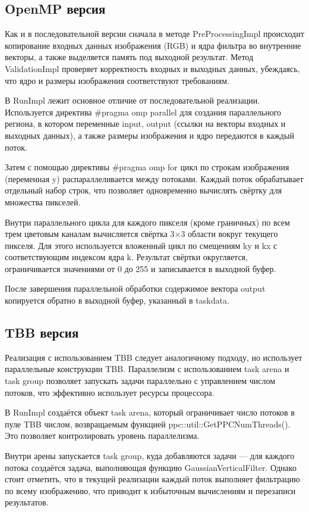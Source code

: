 \documentclass[12pt]{article}
\begin{document}
\subsection{OpenMP версия}

Как и в последовательной версии сначала в методе PreProcessingImpl происходит копирование входных данных изображения (RGB) и ядра фильтра во внутренние векторы, а также выделяется память под выходной результат. Метод ValidationImpl проверяет корректность входных и выходных данных, убеждаясь, что ядро и размеры изображения соответствуют требованиям.

В RunImpl лежит основное отличие от последовательной реализации. Используется директива \#pragma omp parallel для создания параллельного региона, в котором переменные input, output (ссылки на векторы входных и выходных данных), а также размеры изображения и ядро передаются в каждый поток.

Затем с помощью директивы \#pragma omp for цикл по строкам изображения (переменная y) распараллеливается между потоками. Каждый поток обрабатывает отдельный набор строк, что позволяет одновременно вычислять свёртку для множества пикселей.

Внутри параллельного цикла для каждого пикселя (кроме граничных) по всем трем цветовым каналам вычисляется свёртка 3×3 области вокруг текущего пикселя. Для этого используется вложенный цикл по смещениям ky и kx с соответствующим индексом ядра k. Результат свёртки округляется, ограничивается значениями от 0 до 255 и записывается в выходной буфер.

После завершения параллельной обработки содержимое вектора output копируется обратно в выходной буфер, указанный в taskdata.


\subsection{TBB версия}

Реализация с использованием  TBB следует аналогичному подходу, но использует параллельные конструкции TBB.
Параллелизм с использованием task arena и task group позволяет запускать задачи параллельно с управлением числом потоков, что эффективно использует ресурсы процессора.

 В RunImpl создаётся объект task arena, который ограничивает число потоков в пуле TBB числом, возвращаемым функцией ppc::util::GetPPCNumThreads(). Это позволяет контролировать уровень параллелизма.

Внутри арены запускается task group, куда добавляются задачи — для каждого потока создаётся задача, выполняющая функцию GaussianVerticalFilter. Однако стоит отметить, что в текущей реализации каждый поток выполняет фильтрацию по всему изображению, что приводит к избыточным вычислениям и перезаписи результатов.
\end{document}
